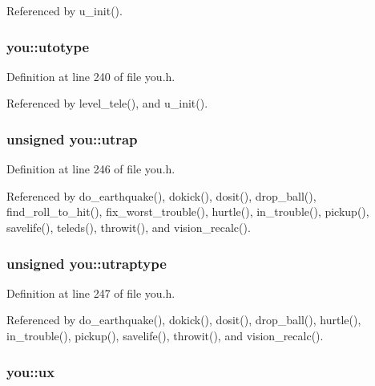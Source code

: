Referenced by u\+\_\+init().

\hypertarget{structyou_aa5df3aa411cedbc63c8d4f4fed175575}{
\subsubsection[{utotype}]{ you\+::utotype}}\label{structyou_aa5df3aa411cedbc63c8d4f4fed175575}


Definition at line 240 of file you.\+h.



Referenced by level\+\_\+tele(), and u\+\_\+init().

\hypertarget{structyou_a7250d3b13a54b76d846b754a2a6f3fa6}{
\subsubsection[{utrap}]{\setlength{\rightskip}{0pt plus 5cm}unsigned you\+::utrap}}\label{structyou_a7250d3b13a54b76d846b754a2a6f3fa6}


Definition at line 246 of file you.\+h.



Referenced by do\+\_\+earthquake(), dokick(), dosit(), drop\+\_\+ball(), find\+\_\+roll\+\_\+to\+\_\+hit(), fix\+\_\+worst\+\_\+trouble(), hurtle(), in\+\_\+trouble(), pickup(), savelife(), teleds(), throwit(), and vision\+\_\+recalc().

\hypertarget{structyou_a1753632ed4b3b8dea40466c1c92fce19}{
\subsubsection[{utraptype}]{\setlength{\rightskip}{0pt plus 5cm}unsigned you\+::utraptype}}\label{structyou_a1753632ed4b3b8dea40466c1c92fce19}


Definition at line 247 of file you.\+h.



Referenced by do\+\_\+earthquake(), dokick(), dosit(), drop\+\_\+ball(), hurtle(), in\+\_\+trouble(), pickup(), savelife(), throwit(), and vision\+\_\+recalc().

\hypertarget{structyou_ace2fd92f7f1a640e45775efe6e5f6cf7}{
\subsubsection[{ux}]{ you\+::ux}}\label{structyou_ace2fd92f7f1a640e45775efe6e5f6cf7}


